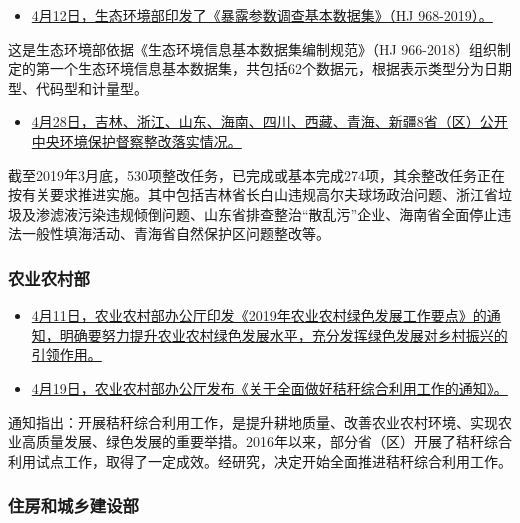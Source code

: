 \documentclass[]{book}
\providecommand{\tightlist}{%
  \setlength{\itemsep}{0pt}\setlength{\parskip}{0pt}}
\begin{document}
\begin{itemize}
\tightlist
\item
  \href{http://fgs.mee.gov.cn/yfxzyfzzfjs/201904/t20190403_698483.shtml}{4月12日，生态环境部印发了《暴露参数调查基本数据集》（HJ 968-2019）。}
\end{itemize}

这是生态环境部依据《生态环境信息基本数据集编制规范》（HJ 966-2018）组织制定的第一个生态环境信息基本数据集，共包括62个数据元，根据表示类型分为日期型、代码型和计量型。

\begin{itemize}
\tightlist
\item
  \href{http://www.mee.gov.cn/xxgk2018/xxgk/xxgk15/201904/t20190428_701237.html}{4月28日，吉林、浙江、山东、海南、四川、西藏、青海、新疆8省（区）公开中央环境保护督察整改落实情况。}
\end{itemize}

截至2019年3月底，530项整改任务，已完成或基本完成274项，其余整改任务正在按有关要求推进实施。其中包括吉林省长白山违规高尔夫球场政治问题、浙江省垃圾及渗滤液污染违规倾倒问题、山东省排查整治``散乱污''企业、海南省全面停止违法一般性填海活动、青海省自然保护区问题整改等。

\hypertarget{ux519cux4e1aux519cux6751ux90e8}{%
\subsubsection*{农业农村部}\label{ux519cux4e1aux519cux6751ux90e8}}

\begin{itemize}
\item
  \href{http://www.moa.gov.cn/ztzl/2019gzzd/sjgzyd/201904/t20190416_6179510.htm}{4月11日，农业农村部办公厅印发《2019年农业农村绿色发展工作要点》的通知，明确要努力提升农业农村绿色发展水平，充分发挥绿色发展对乡村振兴的引领作用。}
\item
  \href{http://www.mee.gov.cn/xxgk2018/xxgk/xxgk01/201903/t20190312_695462.html}{4月19日，农业农村部办公厅发布《关于全面做好秸秆综合利用工作的通知》。}
\end{itemize}

通知指出：开展秸秆综合利用工作，是提升耕地质量、改善农业农村环境、实现农业高质量发展、绿色发展的重要举措。2016年以来，部分省（区）开展了秸秆综合利用试点工作，取得了一定成效。经研究，决定开始全面推进秸秆综合利用工作。

\hypertarget{ux4f4fux623fux548cux57ceux4e61ux5efaux8bbeux90e8}{%
\subsubsection*{住房和城乡建设部}\label{ux4f4fux623fux548cux57ceux4e61ux5efaux8bbeux90e8}}
\end{document}
